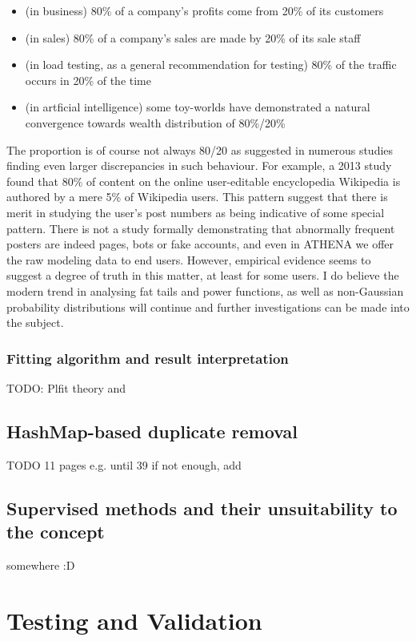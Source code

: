 \documentclass[12pt,a4paper,twoside]{report}
\begin{document}
\begin{itemize}
\item (in business) 80\% of a company's profits come from 20\% of its customers
\item (in sales) 80\% of a company's sales are made by 20\% of its sale staff
\item (in load testing, as a general recommendation for testing) 80\% of the traffic occurs in 20\% of the time
\item (in artficial intelligence) some toy-worlds have demonstrated a natural convergence towards wealth distribution of 80\%/20\%
\end{itemize}

The proportion is of course not always 80/20 as suggested in numerous studies finding even larger discrepancies in such behaviour. For example, a 2013 study \cite{muchnik2013origins} found that 80\% of content on the online user-editable encyclopedia Wikipedia is authored by a mere 5\% of Wikipedia users. This pattern suggest that there is merit in studying the user's post numbers as being indicative of some special pattern. There is not a study formally demonstrating that abnormally frequent posters are indeed pages, bots or fake accounts, and even in ATHENA we offer the raw modeling data to end users. However, empirical evidence seems to suggest a degree of truth in this matter, at least for some users. I do believe the modern trend in analysing fat tails and power functions, as well as non-Gaussian probability distributions will continue and further investigations can be made into the subject.

\subsection{Fitting algorithm and result interpretation}
\label{plfittheory}
TODO: Plfit theory and \cite{clauset2009power}

\section{HashMap-based duplicate removal}
{\color{red}TODO 11 pages e.g. until 39
if not enough, add
\section{Supervised methods and their unsuitability to the concept}
somewhere :D}



\chapter{Testing and Validation}
\end{document}
